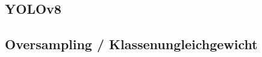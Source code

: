 
\subsection{YOLOv8}
\label{sec:yolov8}


\subsection{Oversampling / Klassenungleichgewicht}
\label{sec:oversampling}


